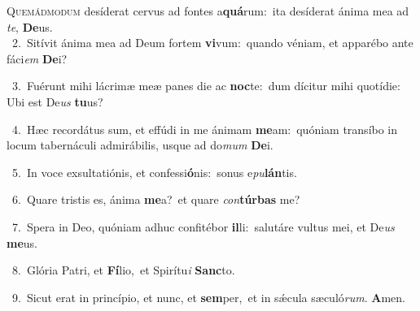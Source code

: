 \lettrine{\initial\textcolor{\initialcolor}{Q}}{uemádmodum} desíderat cervus ad fontes a\-\textbf{quá}\-rum:~\star ita desíderat ánima mea ad \textit{te}\-, \textbf{De}\-us.\\
{\numbfont\textcolor{\numbcolor}{~2.}}~Sitívit ánima mea ad Deum fortem \textbf{vi}\-vum:~\star quando véniam, et apparébo ante fáci\textit{em} \textbf{De}\-i?\par
{\numbfont\textcolor{\numbcolor}{~3.}}~Fuérunt mihi lácrimæ meæ panes die ac \textbf{noc}\-te:~\star dum dícitur mihi quotídie: Ubi est De\textit{us} \textbf{tu}\-us?\par
{\numbfont\textcolor{\numbcolor}{~4.}}~Hæc recordátus sum, et effúdi in me ánimam \textbf{me}\-am:~\star quóniam transíbo in locum tabernáculi admirábilis, usque ad do\textit{mum} \textbf{De}\-i.\par
{\numbfont\textcolor{\numbcolor}{~5.}}~In voce exsultatiónis, et confessi\-\textbf{ó}\-nis:~\star sonus e\-\textit{pu}\-\textbf{lán}tis.\par
{\numbfont\textcolor{\numbcolor}{~6.}}~Quare tristis es, ánima \textbf{me}\-a?~\star et quare \textit{con}\-\textbf{túr}\textbf{bas} me?\par
{\numbfont\textcolor{\numbcolor}{~7.}}~Spera in Deo, quóniam adhuc confitébor \textbf{il}\-li:~\star salutáre vultus mei, et De\textit{us} \textbf{me}\-us.\par
{\numbfont\textcolor{\numbcolor}{~8.}}~Glória Patri, et \textbf{Fí}\-lio,~\star et Spirítu\textit{i} \textbf{Sanc}\-to.\par
{\numbfont\textcolor{\numbcolor}{~9.}}~Sicut erat in princípio, et nunc, et \textbf{sem}\-per,~\star et in sǽcula sæculó\-\textit{rum}\-. \textbf{A}\-men.\par
